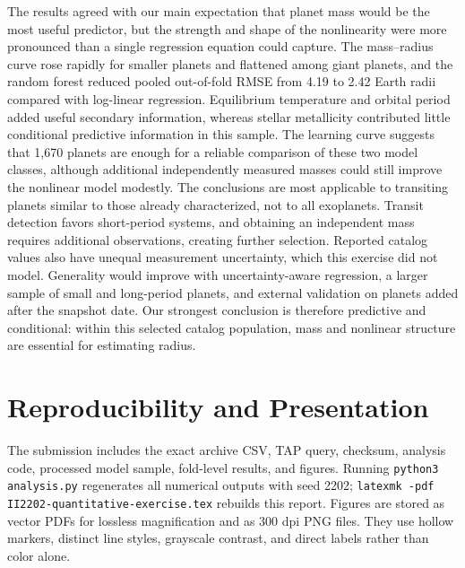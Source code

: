 \documentclass[11pt,a4paper]{article}
\begin{document}
The results agreed with our main expectation that planet mass would be the most useful predictor, but the strength and shape of the nonlinearity were more pronounced than a single regression equation could capture. The mass--radius curve rose rapidly for smaller planets and flattened among giant planets, and the random forest reduced pooled out-of-fold RMSE from 4.19 to 2.42 Earth radii compared with log-linear regression. Equilibrium temperature and orbital period added useful secondary information, whereas stellar metallicity contributed little conditional predictive information in this sample. The learning curve suggests that 1,670 planets are enough for a reliable comparison of these two model classes, although additional independently measured masses could still improve the nonlinear model modestly. The conclusions are most applicable to transiting planets similar to those already characterized, not to all exoplanets. Transit detection favors short-period systems, and obtaining an independent mass requires additional observations, creating further selection. Reported catalog values also have unequal measurement uncertainty, which this exercise did not model. Generality would improve with uncertainty-aware regression, a larger sample of small and long-period planets, and external validation on planets added after the snapshot date. Our strongest conclusion is therefore predictive and conditional: within this selected catalog population, mass and nonlinear structure are essential for estimating radius.

\section{Reproducibility and Presentation}

The submission includes the exact archive CSV, TAP query, checksum, analysis code, processed model sample, fold-level results, and figures. Running \texttt{python3 analysis.py} regenerates all numerical outputs with seed 2202; \texttt{latexmk -pdf II2202-quantitative-exercise.tex} rebuilds this report. Figures are stored as vector PDFs for lossless magnification and as 300 dpi PNG files. They use hollow markers, distinct line styles, grayscale contrast, and direct labels rather than color alone.



\end{document}
